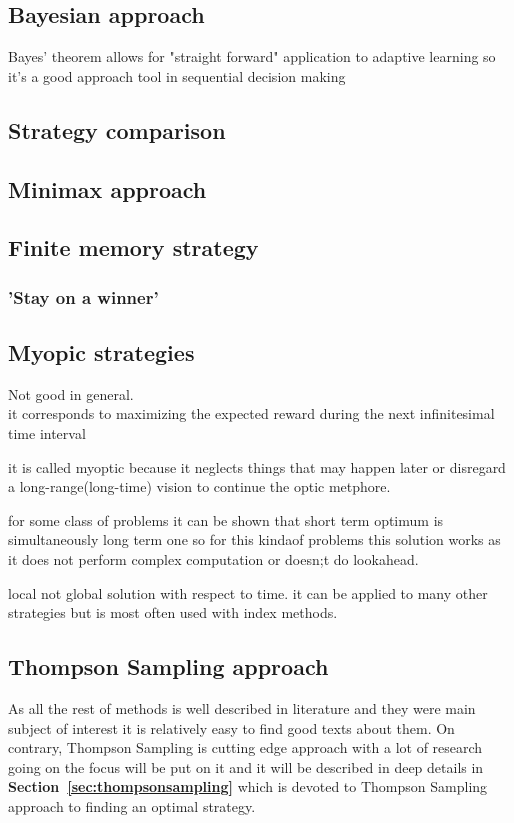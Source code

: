 \documentclass[12pt, a4paper, pdflatex]{report}
\begin{document}
\subsection{Bayesian approach}
Bayes' theorem allows for "straight forward" application to adaptive learning so it's a good approach tool in sequential decision making 

\subsection{Strategy comparison}

\subsection{Minimax approach}

\subsection{Finite memory strategy}
\subsubsection{'Stay on a winner'}

\subsection{Myopic strategies}
Not good in general.\\

it corresponds to maximizing the expected reward during the next infinitesimal time interval

it is called myoptic because it neglects things that may happen later or disregard a long-range(long-time) vision to continue the optic metphore.

for some class of problems it can be shown that short term optimum is simultaneously long term one so for this kindaof problems this solution works as it does not perform complex computation or doesn;t do lookahead.

local not global solution with respect to time.
it can be applied to many other strategies but is most often used with index methods.

\subsection{Thompson Sampling approach}
As all the rest of methods is well described in literature and they were main subject of interest it is relatively easy to find good texts about them. On contrary, Thompson Sampling is cutting edge approach with a lot of research going on the focus will be put on it and it will be described in deep details in  \textbf{Section~\ref{sec:thompsonsampling}} which is devoted to Thompson Sampling approach to finding an optimal strategy.
\end{document}
